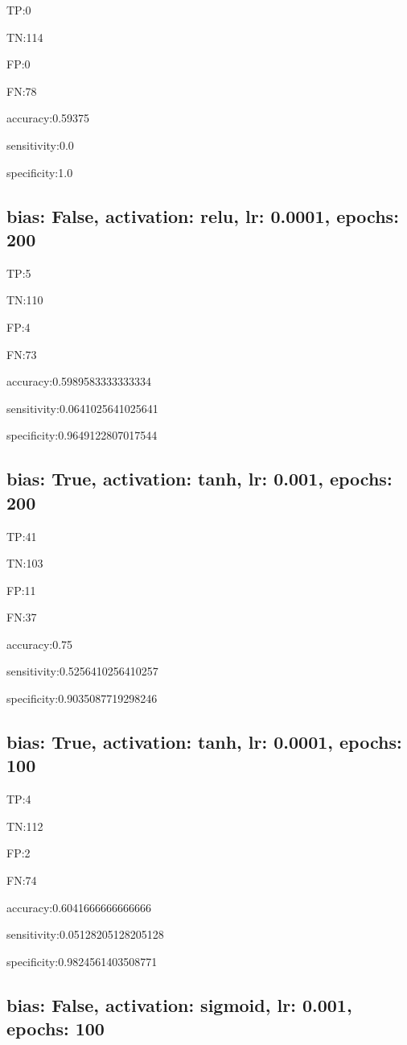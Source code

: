 \documentclass{article}
\begin{document}
TP:0

TN:114

FP:0

FN:78

accuracy:0.59375

sensitivity:0.0

specificity:1.0



\subsection{bias: False, activation: relu, lr: 0.0001, epochs: 200}

TP:5

TN:110

FP:4

FN:73

accuracy:0.5989583333333334

sensitivity:0.0641025641025641

specificity:0.9649122807017544



\subsection{bias: True, activation: tanh, lr: 0.001, epochs: 200}

TP:41

TN:103

FP:11

FN:37

accuracy:0.75

sensitivity:0.5256410256410257

specificity:0.9035087719298246



\subsection{bias: True, activation: tanh, lr: 0.0001, epochs: 100}

TP:4

TN:112

FP:2

FN:74

accuracy:0.6041666666666666

sensitivity:0.05128205128205128

specificity:0.9824561403508771



\subsection{bias: False, activation: sigmoid, lr: 0.001, epochs: 100}
\end{document}
